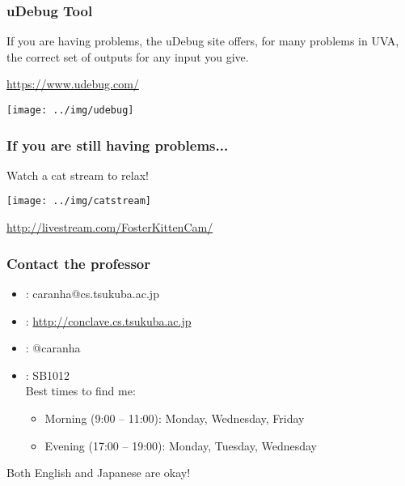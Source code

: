 \documentclass{beamer}
\begin{document}
\begin{frame}
  \frametitle{uDebug Tool}

  If you are having problems, the uDebug site offers, for many
  problems in UVA, the correct set of outputs for any input you give.

  \bigskip

  \url{https://www.udebug.com/}

  \bigskip

  \begin{center}
    \texttt{[image: ../img/udebug]}
  \end{center}
\end{frame}

\begin{frame}
  \frametitle{If you are still having problems...}

  Watch a cat stream to relax!

  \bigskip

  \begin{center}
    \texttt{[image: ../img/catstream]}
  \end{center}

  \bigskip

  \url{http://livestream.com/FosterKittenCam/}
\end{frame}


\begin{frame}
  \frametitle{Contact the professor}
  \begin{itemize}
  \item {}: caranha@cs.tsukuba.ac.jp
  \item {}: \url{http://conclave.cs.tsukuba.ac.jp}
  \item {}: @caranha

    \bigskip

  \item {}: SB1012\\
    Best times to find me:
    \begin{itemize}
    \item Morning (9:00 -- 11:00): Monday, Wednesday, Friday
    \item Evening (17:00 -- 19:00): Monday, Tuesday, Wednesday
    \end{itemize}
  \end{itemize}

  \bigskip

  Both English and Japanese are okay!
\end{frame}
\end{document}
